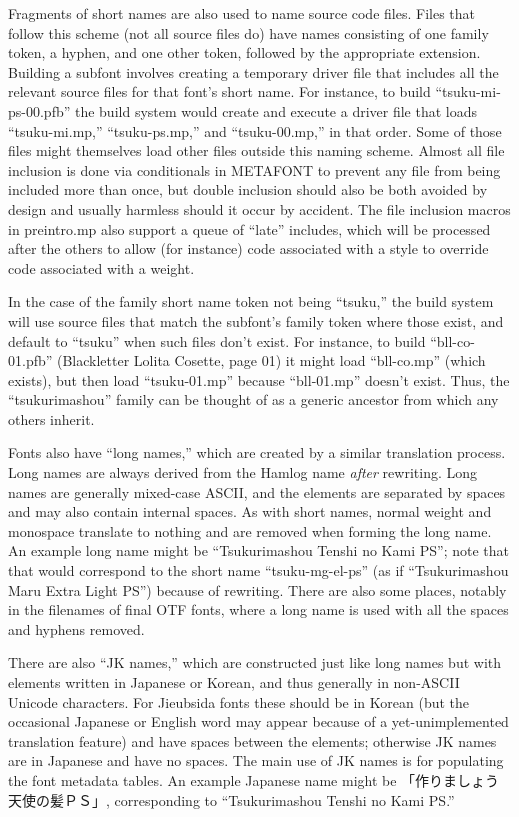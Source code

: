 \documentclass[14pt]{extarticle}
\begin{document}
Fragments of short names are also used to name source code files.  Files
that follow this scheme (not all source files do) have names consisting of
one family token, a hyphen, and one other token, followed by the appropriate
extension.  Building a subfont involves creating a temporary driver file
that includes all the relevant source files for that font's short name.  For
instance, to build ``tsuku-mi-ps-00.pfb'' the build system would create and
execute a driver file that loads ``tsuku-mi.mp,'' ``tsuku-ps.mp,'' and
``tsuku-00.mp,'' in that order.  Some of those files might themselves load
other files outside this naming scheme.  Almost all file inclusion is done
via conditionals in METAFONT to prevent any file from being included more
than once, but double inclusion should also be both avoided by design and
usually harmless should it occur by accident.  The file inclusion macros in
preintro.mp also support a queue of ``late'' includes, which will be
processed after the others to allow (for instance) code associated with a
style to override code associated with a weight.

In the case of the family short name token not being ``tsuku,'' the build
system will use source files that match the subfont's family token where
those exist, and default to ``tsuku'' when such files don't exist.  For
instance, to build ``bll-co-01.pfb'' (Blackletter Lolita Cosette, page 01)
it might load ``bll-co.mp'' (which exists), but then load ``tsuku-01.mp''
because ``bll-01.mp'' doesn't exist.  Thus, the ``tsukurimashou'' family can
be thought of as a generic ancestor from which any others inherit.

Fonts also have ``long names,'' which are created by a similar translation
process.  Long names are always derived from the Hamlog name \emph{after}
rewriting.  Long names are generally mixed-case ASCII, and the elements are
separated by spaces and may also contain internal spaces.  As with short
names, normal weight and monospace translate to nothing and are removed when
forming the long name.  An example long name might be ``Tsukurimashou Tenshi
no Kami PS''; note that that would correspond to the short name
``tsuku-mg-el-ps'' (as if ``Tsukurimashou Maru Extra Light PS'') because of
rewriting.  There are also some places, notably in the filenames of final
OTF fonts, where a long name is used with all the spaces and hyphens
removed.

There are also ``JK names,'' which are constructed just like long names but
with elements written in Japanese or Korean, and thus generally in non-ASCII
Unicode characters.  For Jieubsida fonts these should be in Korean (but the
occasional Japanese or English word may appear because of a
yet-unimplemented translation feature) and have spaces between the elements;
otherwise JK names are in Japanese and have no spaces.  The main use of JK
names is for populating the font metadata tables.  An example Japanese name
might be 「作りましょう天使の髪ＰＳ」, corresponding to ``Tsukurimashou
Tenshi no Kami PS.''
\end{document}
